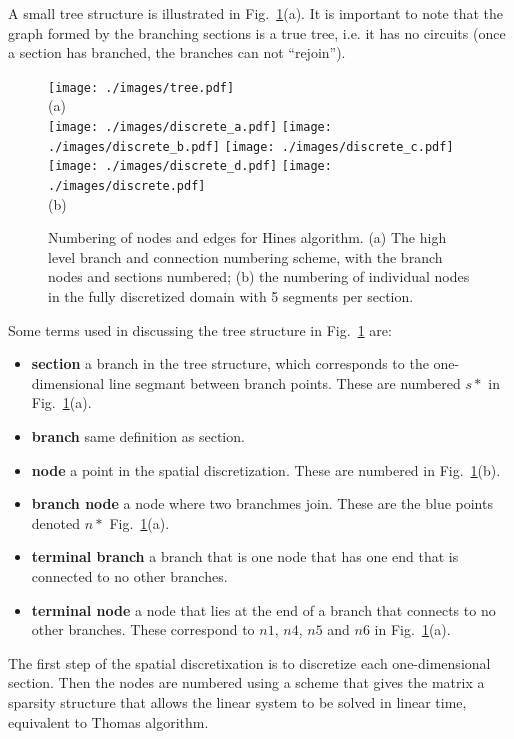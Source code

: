 \documentclass[11pt,a4paper]{article}
\newcommand{\fig}[1]{Fig.~\ref{#1}}
\begin{document}
A small tree structure is illustrated in \fig{fig:tree}(a). It is important to note that the graph formed by the branching sections is a true tree, i.e. it has no circuits (once a section has branched, the branches can not ``rejoin'').

\begin{figure}[htp!]
\centering
\texttt{[image: ./images/tree.pdf]}
\\{\normalsize (a)}\\
\texttt{[image: ./images/discrete\_a.pdf]}
\texttt{[image: ./images/discrete\_b.pdf]}
\texttt{[image: ./images/discrete\_c.pdf]}
\texttt{[image: ./images/discrete\_d.pdf]}
\texttt{[image: ./images/discrete.pdf]}
\\{\normalsize (b)}
\caption{Numbering of nodes and edges for Hines algorithm. (a) The high level branch and connection numbering scheme, with the branch nodes and sections numbered; (b) the numbering of individual nodes in the fully discretized domain with 5 segments per section.}
\label{fig:tree}
\end{figure}

Some terms used in discussing the tree structure in \fig{fig:tree} are:
\begin{itemize}
        \item \textbf{section} a branch in the tree structure, which corresponds to the one-dimensional line segmant between branch points. These are numbered $s*$ in \fig{fig:tree}(a).
        \item \textbf{branch} same definition as section.
        \item \textbf{node} a point in the spatial discretization. These are numbered in \fig{fig:tree}(b).
        \item \textbf{branch node} a node where two branchmes join. These are the blue points denoted $n*$ \fig{fig:tree}(a).
        \item \textbf{terminal branch} a branch that is one node that has one end that is connected to no other branches.
        \item \textbf{terminal node} a node that lies at the end of a branch that connects to no other branches. These correspond to $n1$, $n4$, $n5$ and $n6$ in \fig{fig:tree}(a).
\end{itemize}

The first step of the spatial discretixation is to discretize each one-dimensional section. Then the nodes are numbered using a scheme that gives the matrix a sparsity structure that allows the linear system to be solved in linear time, equivalent to Thomas algorithm.
\end{document}

